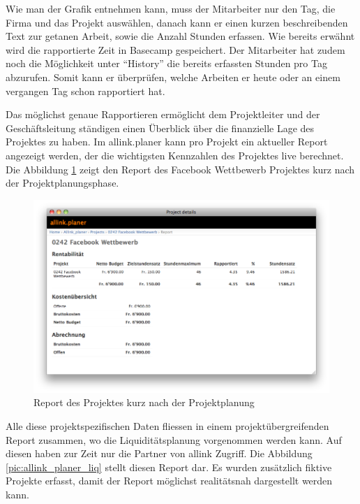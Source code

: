 Wie man der Grafik entnehmen kann, muss der Mitarbeiter nur den Tag, die Firma
und das Projekt auswählen, danach kann er einen kurzen beschreibenden Text
zur getanen Arbeit, sowie die Anzahl Stunden erfassen. Wie bereits erwähnt wird
die rapportierte Zeit in Basecamp gespeichert. Der Mitarbeiter hat zudem noch die Möglichkeit 
unter ``History'' die bereits erfassten Stunden pro Tag abzurufen. Somit kann 
er überprüfen, welche Arbeiten er heute oder an einem vergangen Tag schon rapportiert 
hat.

Das möglichst genaue Rapportieren ermöglicht dem Projektleiter und der Geschäftsleitung
ständigen einen Überblick über die finanzielle Lage des Projektes zu haben.
Im allink.planer kann pro Projekt ein aktueller Report angezeigt werden, der
die wichtigsten Kennzahlen des Projektes live berechnet. Die Abbildung \ref{pic:allink_planer_report}
zeigt den Report des Facebook Wettbewerb Projektes kurz nach der Projektplanungsphase.

\clearpage

\begin{figure}[htbp]
\begin{center}
\includegraphics[width=1.0\textwidth,angle=0]{./bilder/proof_of_concept/allink_planer_report.png}
\caption[Report des Projektes kurz nach der Projektplanung]{Report des Projektes 
    kurz nach der Projektplanung\footnotemark}
\label{pic:allink_planer_report}
\end{center}
\end{figure}

Alle diese projektspezifischen Daten fliessen in einem projektübergreifenden
Report zusammen, wo die Liquiditätsplanung vorgenommen werden kann. Auf diesen
haben zur Zeit nur die Partner von allink Zugriff. Die Abbildung \ref{pic:allink_planer_liq} stellt
diesen Report dar. Es wurden zusätzlich fiktive Projekte erfasst, damit der
Report möglichst realitätsnah dargestellt werden kann.

